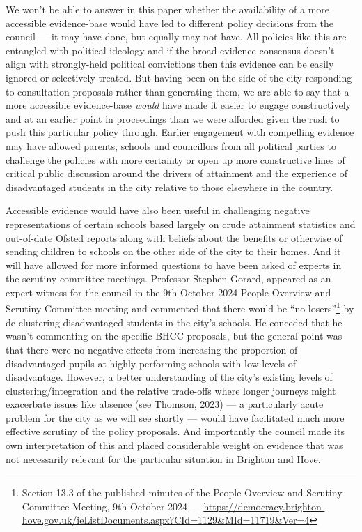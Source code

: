 \documentclass[
  11pt,
]{article}
\begin{document}
We won't be able to answer in this paper whether the availability of a
more accessible evidence-base would have led to different policy
decisions from the council --- it may have done, but equally may not
have. All policies like this are entangled with political ideology and
if the broad evidence consensus doesn't align with strongly-held
political convictions then this evidence can be easily ignored or
selectively treated. But having been on the side of the city responding
to consultation proposals rather than generating them, we are able to
say that a more accessible evidence-base \emph{would} have made it
easier to engage constructively and at an earlier point in proceedings
than we were afforded given the rush to push this particular policy
through. Earlier engagement with compelling evidence may have allowed
parents, schools and councillors from all political parties to challenge
the policies with more certainty or open up more constructive lines of
critical public discussion around the drivers of attainment and the
experience of disadvantaged students in the city relative to those
elsewhere in the country.

Accessible evidence would have also been useful in challenging negative
representations of certain schools based largely on crude attainment
statistics and out-of-date Ofsted reports along with beliefs about the
benefits or otherwise of sending children to schools on the other side
of the city to their homes. And it will have allowed for more informed
questions to have been asked of experts in the scrutiny committee
meetings. Professor Stephen Gorard, appeared as an expert witness for
the council in the 9th October 2024 People Overview and Scrutiny
Committee meeting and commented that there would be ``no
losers''\footnote{Section 13.3 of the published minutes of the People
  Overview and Scrutiny Committee Meeting, 9th October 2024 ---
  \url{https://democracy.brighton-hove.gov.uk/ieListDocuments.aspx?CId=1129&MId=11719&Ver=4}}
by de-clustering disadvantaged students in the city's schools. He
conceded that he wasn't commenting on the specific BHCC proposals, but
the general point was that there were no negative effects from
increasing the proportion of disadvantaged pupils at highly performing
schools with low-levels of disadvantage. However, a better understanding
of the city's existing levels of clustering/integration and the relative
trade-offs where longer journeys might exacerbate issues like absence
(see Thomson, 2023) --- a particularly acute problem for the city as we
will see shortly --- would have facilitated much more effective scrutiny
of the policy proposals. And importantly the council made its own
interpretation of this and placed considerable weight on evidence that
was not necessarily relevant for the particular situation in Brighton
and Hove.
\end{document}
